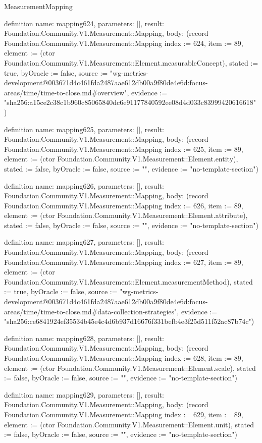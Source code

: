 \begin{lexlean}{MeasurementMapping}
\begin{semanticmodule}
definition{
  name: mapping624,
  parameters: [],
  result: Foundation.Community.V1.Measurement::Mapping,
  body: (record Foundation.Community.V1.Measurement::Mapping {index := 624, item := 89, element := (ctor Foundation.Community.V1.Measurement::Element.measurableConcept), stated := true, byOracle := false, source := "wg-metrics-development@003671d4c461fda2487aae612db00a9f80de4e6d:focus-areas/time/time-to-close.md#overview", evidence := "sha256:a15ce2c38c1b960c85065840dc6e91177840592ee08d4d033c83999420616618"})
}

definition{
  name: mapping625,
  parameters: [],
  result: Foundation.Community.V1.Measurement::Mapping,
  body: (record Foundation.Community.V1.Measurement::Mapping {index := 625, item := 89, element := (ctor Foundation.Community.V1.Measurement::Element.entity), stated := false, byOracle := false, source := "", evidence := "no-template-section"})
}

definition{
  name: mapping626,
  parameters: [],
  result: Foundation.Community.V1.Measurement::Mapping,
  body: (record Foundation.Community.V1.Measurement::Mapping {index := 626, item := 89, element := (ctor Foundation.Community.V1.Measurement::Element.attribute), stated := false, byOracle := false, source := "", evidence := "no-template-section"})
}

definition{
  name: mapping627,
  parameters: [],
  result: Foundation.Community.V1.Measurement::Mapping,
  body: (record Foundation.Community.V1.Measurement::Mapping {index := 627, item := 89, element := (ctor Foundation.Community.V1.Measurement::Element.measurementMethod), stated := true, byOracle := false, source := "wg-metrics-development@003671d4c461fda2487aae612db00a9f80de4e6d:focus-areas/time/time-to-close.md#data-collection-strategies", evidence := "sha256:ce6841924ef35534b45e4c4d6b937d16676f331befb4e3f25d511f52ac87b74c"})
}

definition{
  name: mapping628,
  parameters: [],
  result: Foundation.Community.V1.Measurement::Mapping,
  body: (record Foundation.Community.V1.Measurement::Mapping {index := 628, item := 89, element := (ctor Foundation.Community.V1.Measurement::Element.scale), stated := false, byOracle := false, source := "", evidence := "no-template-section"})
}

definition{
  name: mapping629,
  parameters: [],
  result: Foundation.Community.V1.Measurement::Mapping,
  body: (record Foundation.Community.V1.Measurement::Mapping {index := 629, item := 89, element := (ctor Foundation.Community.V1.Measurement::Element.unit), stated := false, byOracle := false, source := "", evidence := "no-template-section"})
}


\end{semanticmodule}
\end{lexlean}
